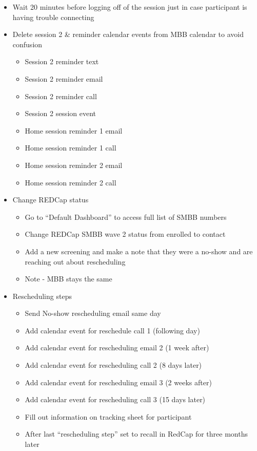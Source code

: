 \documentclass[
]{book}
\providecommand{\tightlist}{%
  \setlength{\itemsep}{0pt}\setlength{\parskip}{0pt}}
\begin{document}
\begin{itemize}
\item
  Wait 20 minutes before logging off of the session just in case participant is having trouble connecting
\item
  Delete session 2 \& reminder calendar events from MBB calendar to avoid confusion

  \begin{itemize}
  \tightlist
  \item
    Session 2 reminder text
  \item
    Session 2 reminder email
  \item
    Session 2 reminder call
  \item
    Session 2 session event\\
  \item
    Home session reminder 1 email
  \item
    Home session reminder 1 call
  \item
    Home session reminder 2 email
  \item
    Home session reminder 2 call
  \end{itemize}
\item
  Change REDCap status

  \begin{itemize}
  \tightlist
  \item
    Go to ``Default Dashboard'' to access full list of SMBB numbers
  \item
    Change REDCap SMBB wave 2 status from enrolled to contact
  \item
    Add a new screening and make a note that they were a no-show and are reaching out about rescheduling
  \item
    Note - MBB stays the same
  \end{itemize}
\item
  Rescheduling steps

  \begin{itemize}
  \tightlist
  \item
    Send No-show rescheduling email same day\\
  \item
    Add calendar event for reschedule call 1 (following day)\\
  \item
    Add calendar event for rescheduling email 2 (1 week after)\\
  \item
    Add calendar event for rescheduling call 2 (8 days later)\\
  \item
    Add calendar event for rescheduling email 3 (2 weeks after)\\
  \item
    Add calendar event for rescheduling call 3 (15 days later)\\
  \item
    Fill out information on tracking sheet for participant\\
  \item
    After last ``rescheduling step'' set to recall in RedCap for three months later
  \end{itemize}
\end{itemize}
\end{document}
